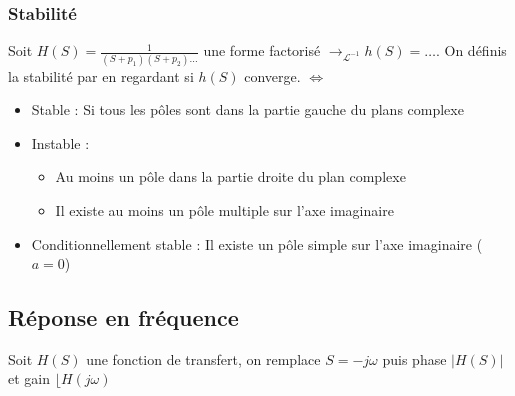 \documentclass{article}
\theoremstyle{plain}%
\theoremstyle{definition}
\theoremstyle{remark}
\begin{document}
\subsubsection{Stabilité}
Soit $ H(S) = \frac{1}{(S+p_1)(S+p_2)\dots} $ une forme factorisé $ \to_{\mathcal{L}^{-1}} h(S)=\dots$. On définis la stabilité par en regardant si $ h(S) $ converge. $ \Leftrightarrow $ \begin{itemize}
    \item Stable : Si tous les pôles sont dans la partie gauche du plans complexe
    \item Instable : \begin{itemize}
        \item Au moins un pôle dans la partie droite du plan complexe
        \item Il existe au moins un pôle multiple sur l'axe imaginaire
    \end{itemize}
    \item Conditionnellement stable : Il existe un pôle simple sur l'axe imaginaire ($a=0$)
\end{itemize}


\subsection{Réponse en fréquence}
Soit $ H(S) $ une fonction de transfert, on remplace $ S = -j \omega $ puis phase $ \left| H(S) \right|  $ et gain $ \lfloor H(j \omega ) $ 
\end{document}
